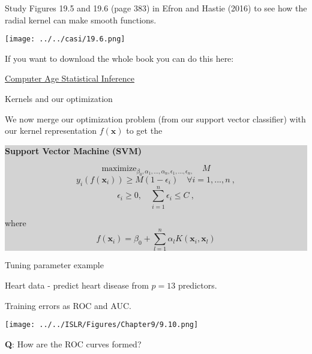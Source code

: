 \documentclass[10pt,ignorenonframetext,]{beamer}
\begin{document}
\begin{frame}

Study Figures 19.5 and 19.6 (page 383) in Efron and Hastie (2016) to see
how the radial kernel can make smooth functions.

\centering
\texttt{[image: ../../casi/19.6.png]}

\flushleft
\small

If you want to download the whole book you can do this here:

\href{https://web.stanford.edu/~hastie/CASI_files/PDF/casi.pdf}{Computer
Age Statistical Inference}

\end{frame}

\begin{frame}

\begin{block}{Kernels and our optimization}

\vspace{2mm}

We now merge our optimization problem (from our support vector
classifier) with our kernel representation \(f({\boldsymbol x})\) to get
the \vspace{2mm}

\colorbox{lightgray}{\begin{minipage}{10cm}
{\bf Support Vector Machine (SVM)}

$$\mathrm{maximize}_{\beta_0,\alpha_1,...,\alpha_n,\epsilon_1,...,\epsilon_n,} \quad M $$
$$y_i(f({\boldsymbol x}_i))\geq M(1-\epsilon_i) \quad  \forall i=1,...,n \ ,$$
$$\epsilon_i\geq 0, \quad \sum_{i=1}^n \epsilon_i \leq C \ ,$$

where 
$$f({\boldsymbol x}_i)=\beta_0 +\sum_{l=1}^n \alpha_l K({\boldsymbol x}_i,{\boldsymbol x}_l)$$
\end{minipage}}

\end{block}

\end{frame}

\begin{frame}

\begin{block}{Tuning parameter example}

\vspace{2mm}

Heart data - predict heart disease from \(p=13\) predictors.

Training errors as ROC and AUC.

\vspace{1mm}

\centering

\texttt{[image: ../../ISLR/Figures/Chapter9/9.10.png]}

\textbf{Q}: How are the ROC curves formed?

\end{block}

\end{frame}
\end{document}
